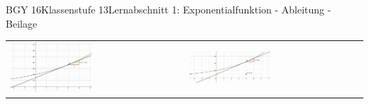 \documentclass[oneside,openany,headings=optiontotoc,11pt,numbers=noenddot]{scrreprt}
\begin{document}
\begin{worksheet}{BGY 16}{Klassenstufe 13}{Lernabschnitt 1: Exponentialfunktion - Ableitung - Beilage}
\begin{framed}
\begin{tabularx}{\textwidth}{X|X}
				\\
				\includegraphics[width=0.48\textwidth]{../99_Bilder/01_ExpFkt/AbleFkt/3.png} & \includegraphics[width=0.48\textwidth]{../99_Bilder/01_ExpFkt/AbleFkt/4.png}\\
			\end{tabularx}
		\end{framed}
	\end{worksheet}
\end{document}
